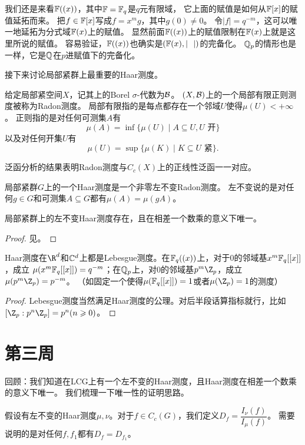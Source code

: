 我们还是来看$\mathbb{F}((x))$，其中$\mathbb{F} = \mathbb{F}_q$是$q$元有限域，
它上面的赋值是如何从$\mathbb{F}[x]$的赋值延拓而来。
把$f \in \mathbb{F}[x]$写成$f = x^mg$，其中$g(0) \neq 0$。
令$|f| = q^{-m}$，这可以唯一地延拓为分式域$\mathbb{F}(x)$上的赋值。
显然前面$\mathbb{F}((x))$上的赋值限制在$\mathbb{F}(x)$上就是这里所说的赋值。
容易验证，$\mathbb{F}((x))$也确实是$(\mathbb{F}(x),|\ \ |)$的完备化。
$\mathbb{Q}_p$的情形也是一样，它是$\mathbb{Q}$在$p$进赋值下的完备化。

接下来讨论局部紧群上最重要的Haar测度。
\begin{definition}
给定局部紧空间$X$，记其上的Borel $\sigma$-代数为$\mathcal{B}$。
$(X,\mathcal{B})$上的一个局部有限正则测度被称为Radon测度。
局部有限指的是每点都存在一个邻域$U$使得$\mu(U) < +\infty$。
正则指的是对任何可测集$A$有\[\mu(A) = \inf\{\mu(U) \mid A \subseteq U, U\text{ 开}\}\]
以及对任何开集$U$有\[\mu(U) = \sup\{\mu(K) \mid K \subseteq U\text{ 紧}\}.\]
\end{definition}
泛函分析的结果表明Radon测度与$C_c(X)$上的正线性泛函一一对应。
\begin{definition}
    局部紧群$G$上的一个Haar测度是一个非零左不变Radon测度。
    左不变说的是对任何$g \in G$和可测集$A \subseteq G$都有$\mu(A) = \mu(gA)$。
\end{definition}
\begin{theorem}[Haar]
局部紧群上的左不变Haar测度存在，且在相差一个数乘的意义下唯一。
\end{theorem}
\begin{proof}
    见\cite{Pr}。
\end{proof}
\begin{example}[常见空间上的Haar测度]
Haar测度在$\R^d$和$\mathbb{C}^d$上都是Lebesgue测度。在$\mathbb{F}_q((x))$上，对于$0$的邻域基$x^m\mathbb{F}_q[[x]]$，成立
$\mu(x^m\mathbb{F}_q[[x]]) = q^{-m}$；在$\mathbb{Q}_p$上，对$0$的邻域基$p^m\Z_p$，成立$\mu(p^m\Z_p) = p^{-m}$。
（如固定一个使得$\mu(\mathbb{F}_q[[x]]) = 1$或者$\mu(\Z_p) = 1$的测度）
\end{example}
\begin{proof}
    Lebesgue测度当然满足Haar测度的公理。对后半段话算指标就行，比如$[\Z_p:p^n\Z_p] = p^n (n \geqslant 0)$。
\end{proof}
\section{第三周}
回顾：我们知道在LCG上有一个左不变的Haar测度，且Haar测度在相差一个数乘的意义下唯一。
我们梳理一下唯一性的证明思路。

假设有左不变的Haar测度$\mu,\nu$。对于$f \in C_c(G)$，我们定义$D_f = \dfrac{I_\nu(f)}{I_\mu(f)}$。
需要说明的是对任何$f,f_1$都有$D_f = D_{f_1}$。

